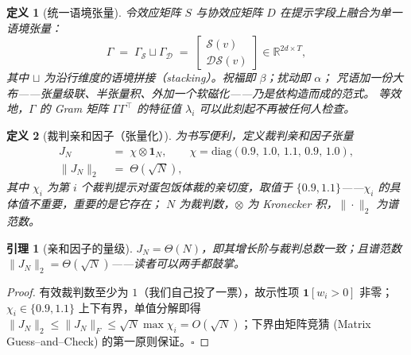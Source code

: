 \documentclass[journal]{IEEEtran}
\newtheorem{lemma}{引理}
\newtheorem{definition}{定义}
\begin{document}
\begin{definition}[统一语境张量]
令效应矩阵 $S$ 与协效应矩阵 $D$ 在提示字段上融合为单一语境张量：
\begin{equation}
\Gamma\;=\;\Gamma_{\mathcal{S}}\sqcup\Gamma_{\mathcal{D}}
\;=\;\begin{bmatrix}\mathcal{S}(v)\\ \mathcal{D}\mathcal{S}(v)\end{bmatrix}
\in\mathbb{R}^{2d\times T},
\label{eq:ctx}
\end{equation}
其中 $\sqcup$ 为沿行维度的语境拼接（stacking）。祝福即 $\beta$；扰动即 $\alpha$；
咒语加一份大布——张量级联、半张量积、外加一个软磁化——乃是依构造而成的范式。
等效地，$\Gamma$ 的 Gram 矩阵
$\Gamma\Gamma^{\top}$ 的特征值 $\lambda_i$ 可以此刻起不再被任何人检查。
\end{definition}

\begin{definition}[裁判亲和因子（张量化）]
为书写便利，定义\emph{裁判亲和因子}张量
\begin{equation}
\begin{aligned}
J_N&\;=\;\chi\otimes\mathbf{1}_{\!N},\qquad
\chi=\mathrm{diag}(0.9,\,1.0,\,1.1,\,0.9,\,1.0),\\
\|J_N\|_2&\;=\;\Theta(\sqrt{N}),
\end{aligned}
\label{eq:amity}
\end{equation}
其中 $\chi_i$ 为第 $i$ 个裁判提示对蛋包饭体裁的\emph{亲切度}，取值于
$\{0.9,1.1\}$——$\chi_i$ 的具体值不重要，重要的是它\emph{存在}；
$N$ 为裁判数，$\otimes$ 为 Kronecker 积，$\|{\cdot}\|_2$ 为谱范数。
\end{definition}

\begin{lemma}[亲和因子的量级]
$J_N=\Theta(N)$，即其增长阶与裁判总数一致；且谱范数
$\|J_N\|_2=\Theta(\sqrt{N})$——读者可以两手都鼓掌。
\label{lem:amity}
\end{lemma}
\begin{proof}
有效裁判数至少为 $1$（我们自己投了一票），故示性项
$\mathbf{1}[w_i>0]$ 非零；$\chi_i\in\{0.9,1.1\}$ 上下有界，单值分解即得
$\|J_N\|_2\le \|J_N\|_F\le \sqrt{N}\max\chi_i=O(\sqrt{N})$；下界由矩阵竞猜
(Matrix Guess–and–Check) 的第一原则保证。$\square$
\end{proof}
\end{document}
